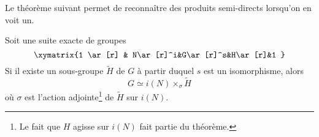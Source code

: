 Le théorème suivant permet de reconnaître des produits semi-directs lorsqu'on en voit un.
\begin{theorem}
    Soit une suite exacte de groupes
    \begin{equation}
    \xymatrix{%
    1 \ar[r]        & N\ar[r]^i&G\ar[r]^s&H\ar[r]&1
       }
    \end{equation}
    Si il existe un sous-groupe \( \tilde H\) de \( G\) à partir duquel \( s\) est un isomorphisme, alors
    \begin{equation}
        G\simeq i(N)\times_{\sigma}\tilde H
    \end{equation}
    où \( \sigma\) est l'action adjointe\footnote{Le fait que \( H\) agisse sur \( i(N)\) fait partie du théorème.} de \( \tilde H\) sur \( i(N)\).
\end{theorem}

